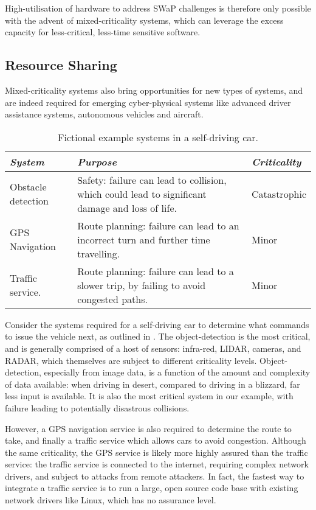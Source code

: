 High-utilisation of hardware to address SWaP challenges is therefore only possible with the advent
of mixed-criticality systems, which can leverage the excess capacity for less-critical, less-time
sensitive software.

\subsection{Resource Sharing}

Mixed-criticality systems also bring opportunities for new types of
systems, and are indeed required for emerging cyber-physical systems like
advanced driver assistance systems, autonomous vehicles and aircraft.

\begin{table} 
\centering
\begin{tabularx}{\textwidth}{lXl}\toprule
    \emph{System}            & \emph{Purpose}                                                           & \emph{Criticality} \\\midrule
     Obstacle detection      & Safety: failure can lead to collision, which could lead to significant
    damage and loss of life. & Catastrophic    \\
    \gls{GPS} Navigation          & Route planning:  failure can lead to an incorrect turn and further
    time travelling.         & Minor \\
     Traffic service.        & Route planning: failure can lead to a slower trip, by failing to
    avoid congested paths.
    & Minor \\
    \bottomrule
\end{tabularx}
\caption{Fictional example systems in a self-driving car.}
\label{tab:self-driving-car}
\end{table}

Consider the systems required for a self-driving car to determine what commands to issue the vehicle
next, as outlined in . The object-detection is the most critical, and is
generally comprised of a host of sensors: infra-red, LIDAR, cameras, and RADAR, which themselves
are subject to different criticality levels. Object-detection,
especially from image data, is a function of the amount and complexity of data available: when
driving in desert, compared to driving in a blizzard, far less input is available. It is also the
most critical system in our example, with failure leading to potentially disastrous collisions.

However, a GPS navigation service is also required to determine the route to take, and finally a
traffic service which allows cars to avoid congestion. Although the same criticality, the GPS
service is likely more highly assured than the traffic service: the traffic service is connected to
the internet, requiring complex network drivers, and subject to attacks from remote attackers. 
In fact, the fastest way to integrate a traffic service is to run a large, open source code base
with existing network drivers like Linux, which has no assurance level. 

